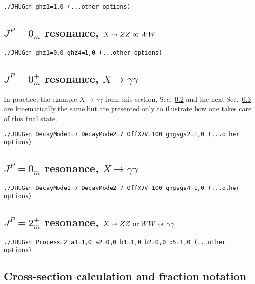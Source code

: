 \documentclass[aps,superscriptaddress,nofootinbib]{revtex4}
\begin{document}
\begin{verbatim}
./JHUGen ghz1=1,0 (...other options)
\end{verbatim}

\subsection{ $J^P = 0^-_m$ resonance, $X \to ZZ~{\rm or}~WW$}
\label{sec:exB}

\begin{verbatim}
./JHUGen ghz1=0,0 ghz4=1,0 (...other options)
\end{verbatim}

\subsection{ $J^P = 0^+_m$ resonance, $X \to \gamma \gamma$}
\label{sec:exC}

In practice, the example $X \to \gamma \gamma$ from this section, Sec.~\ref{sec:exC} and the next Sec.~\ref{sec:exD} are
kinematically the same but are presented only to illustrate how one takes care of this final state.

\begin{verbatim}
./JHUGen DecayMode1=7 DecayMode2=7 OffXVV=100 ghgsgs2=1,0 (...other options)
\end{verbatim}

\subsection{ $J^P = 0^-_m$ resonance, $X \to \gamma \gamma$}
\label{sec:exD}

\begin{verbatim}
./JHUGen DecayMode1=7 DecayMode2=7 OffXVV=100 ghgsgs4=1,0 (...other options)
\end{verbatim}

\subsection{ $J^P = 2^+_m$ resonance, $X \to ZZ~{\rm or}~WW~{\rm or}~\gamma \gamma$}

\begin{verbatim}
./JHUGen Process=2 a1=1,0 a2=0,0 b1=1,0 b2=0,0 b5=1,0 (...other options)
\end{verbatim}

\subsection{Cross-section calculation and fraction notation}
\end{document}
